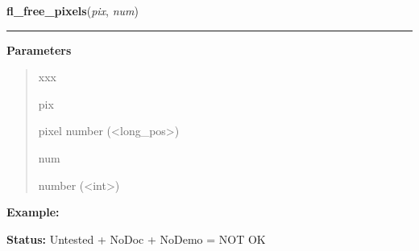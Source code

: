 \hspace{.8\funcindent}\begin{boxedminipage}{\funcwidth}

    \raggedright \textbf{fl\_free\_pixels}(\textit{pix}, \textit{num})

    \vspace{-1.5ex}

    \rule{\textwidth}{0.5\fboxrule}
\setlength{\parskip}{2ex}
\setlength{\parskip}{1ex}
      \textbf{Parameters}
      \vspace{-1ex}

      \begin{quote}
        \begin{Ventry}{xxx}

          \item[pix]

          pixel number ({\textless}long\_pos{\textgreater})

          \item[num]

          number ({\textless}int{\textgreater})

        \end{Ventry}

      \end{quote}

\textbf{Example:} 

\textbf{Status:} Untested + NoDoc + NoDemo = NOT OK



    \end{boxedminipage}

    \label{xformslib:library:fl_set_color_leak}

    \vspace{0.5ex}

